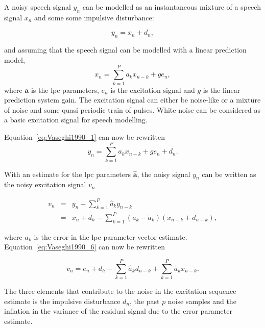A noisy speech signal $y_n$ can be modelled as an instantaneous mixture of a speech signal $x_n$ and some some impulsive disturbance:

\begin{equation}\label{eq:Vaseghi1990_1}
y_n = x_n + d_n,
\end{equation}

and assuming that the speech signal can be modelled with a linear prediction model,
\begin{equation}\label{eq:Vaseghi1990_4}
x_n = \sum^P_{k=1} a_k x_{n-k} +ge_n,
\end{equation}
where $\mathbf{a}$ is the \gls{lpc} parameters, $e_n$ is the excitation signal and $g$ is the linear prediction system gain. The excitation signal can either be noise-like or a mixture of noise and some quasi periodic train of pulses. White noise can be considered as a basic excitation signal for speech modelling\cite{Vaseghi1990}.

Equation~\ref{eq:Vaseghi1990_1} can now be rewritten
\begin{equation}\label{eq:Vaseghi1990_5}
y_n = \sum^P_{k=1} a_k x_{n-k} + ge_n + d_n.
\end{equation}

With an estimate for the \gls{lpc} parameters $\mathbf{\hat{a}}$, the noisy signal $y_n$ can be written as the noisy excitation signal $v_n$

\begin{eqnarray}
  v_n &=& y_n - \sum^P_{k=1} \hat{a}_k y_{n-k} \nonumber\\
  &=& x_n + d_h - \sum^P_{k=1} (a_k - \tilde{a}_k)(x_{n-k} + d_{n-k}),\label{eq:Vaseghi1990_6}
\end{eqnarray}

where $a_k$ is the error in the \gls{lpc} parameter vector estimate. Equation~\ref{eq:Vaseghi1990_6} can now be rewritten

\begin{equation}\label{eq:Vaseghi1990_7}
v_n = e_n + d_h - \sum^P_{k=1} \hat{a}_k d_{n-k} + \sum^P_{k=1} \tilde{a}_k x_{n-k}.
\end{equation}

The three elements that contribute to the noise in the excitation sequence estimate is the impulsive disturbance $d_n$, the past $p$ noise samples and the inflation in the variance of the residual signal due to the error parameter estimate\cite{Vaseghi1990}.

